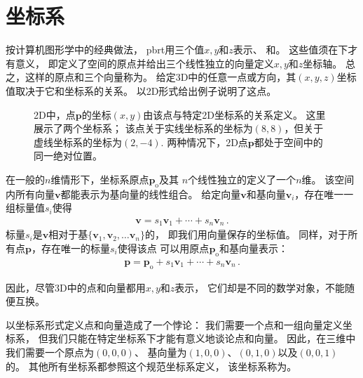 \section{坐标系}\label{sec:坐标系}

按计算机图形学中的经典做法，
pbrt用三个值$x,y$和$z$表示、
和。
这些值须在下才有意义，
即定义了空间的原点并给出三个线性独立的向量定义$x,y$和$z$坐标轴。
总之，这样的原点和三个向量称为。
给定3D中的任意一点或方向，其$(x,y,z)$坐标值取决于它和坐标系的关系。
以2D形式给出例子说明了这点。
\begin{figure}[htbp]
    \centering
    \caption{2D中，点$\bm p$的坐标$(x,y)$由该点与特定2D坐标系的关系定义。
        这里展示了两个坐标系；
        该点关于实线坐标系的坐标为$(8,8)$，但关于虚线坐标系的坐标为$(2,-4)$.
        两种情况下，2D点$\bm p$都处于空间中的同一绝对位置。}
    \label{fig:2.1}
\end{figure}

在一般的$n$维情形下，坐标系原点$\bm p_\mathrm{o}$及其
$n$个线性独立的定义了一个$n$维。
该空间内所有向量$\bm v$都能表示为基向量的线性组合。
给定向量$\bm v$和基向量$\bm v_i$，存在唯一一组标量值$s_i$使得
\begin{align*}
    \bm v=s_1\bm v_1+\cdots+s_n\bm v_n\, .
\end{align*}
标量$s_i$是$\bm v$相对于基$\{\bm v_1,\bm v_2,\ldots \bm v_n\}$的，
即我们用向量保存的坐标值。
同样，对于所有点$\bm p$，存在唯一的标量$s_i$使得该点
可以用原点$\bm p_\mathrm{o}$和基向量表示：
\begin{align*}
    \bm p=\bm p_\mathrm{o}+s_1\bm v_1+\cdots+s_n\bm v_n\, .
\end{align*}

因此，尽管3D中的点和向量都用$x,y$和$z$表示，
它们却是不同的数学对象，不能随便互换。

以坐标系形式定义点和向量造成了一个悖论：
我们需要一个点和一组向量定义坐标系，
但我们只能在特定坐标系下才能有意义地谈论点和向量。
因此，在三维中我们需要一个原点为$(0,0,0)$、
基向量为$(1,0,0)$、$(0,1,0)$以及$(0,0,1)$
的。
其他所有坐标系都参照这个规范坐标系定义，
该坐标系称为。

